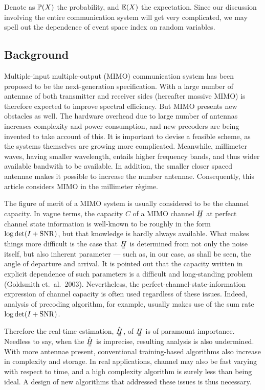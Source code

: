Denote as \(\mathbb{P}(X)\) the probability, and \(\mathbb{E}(X)\) the expectation.
Since our discussion involving the entire communication system will get very complicated, we may spell out the dependence of event space index on random variables.

\subsection{Background}

Multiple-input multiple-output (MIMO) communication system has been proposed to be the next-generation specification.
With a large number of antennae of both transmitter and receiver sides (hereafter massive MIMO) is therefore expected to improve spectral efficiency.
But MIMO presents new obstacles as well.
The hardware overhead due to large number of antennas increases complexity and power consumption, and new precoders are being invented to take account of this.
It is important to devise a feasible scheme, as the systems themselves are growing more complicated.
Meanwhile, millimeter waves, having smaller wavelength, entails higher frequency bands, and thus wider available bandwith to be available.
In addition, the smaller closer spaced antennae makes it possible to increase the number antennae.
Consequently, this article considers MIMO in the millimeter r\`egime.

The figure of merit of a MIMO system is usually considered to be the channel capacity.
In vague terms, the capacity \(C\) of a MIMO channel \(\M{H}\) at perfect channel state information is well-known to be roughly in the form \(\log \det (I +\mathrm{SNR})\), but that knowledge is hardly always available.
What makes things more difficult is the case that \(\M{H}\) is determined from not only the noise itself, but also inherent parameter --- such as, in our case, as shall be seen, the angle of departure and arrival.
It is pointed out that the capacity written in explicit dependence of such parameters is a difficult and long-standing problem (Goldsmith et.\ al.\ 2003).
Nevertheless, the perfect-channel-state-information expression of channel capacity is often used regardless of these issues.
Indeed, analysis of precoding algorithm, for example, usually makes use of the sum rate \(\log \det (I +\mathrm{SNR})\).

Therefore the real-time estimation, \(\hat{\M{H}}\), of \(\M{H}\) is of paramount importance.
Needless to say, when the \(\hat{\M{H}}\) is imprecise, resulting analysis is also undermined.
With more antennae present, conventional training-based algorithms also increase in complexity and storage.
In real applications, channel may also be fast varying with respect to time, and a high complexity algorithm is surely less than being ideal.
A design of new algorithms that addressed these issues is thus necessary.

